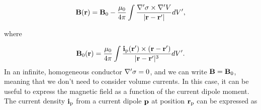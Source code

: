 {\begin{equation}\label{eq:MEG:ampere-laplace-split}
{\bf B}({\bf r}) = {\bf B}_\mathrm{0} - \frac{\mu_0}{4\pi} \int \frac{{\bf \nabla}' \sigma \times {\bf \nabla}' V}{|{\bf r} - {\bf r}'|} dV',
\end{equation}

where 

\begin{equation}\label{eq:MEG:B0}
{\bf B}_0({\bf r}) = \frac{\mu_0}{4\pi} \int \frac{ {\bf i}_\mathrm{p}({\bf r}') \times ({\bf r} - {\bf r}')}{|{\bf r} - {\bf r}'|^3} dV'.
\end{equation}
In an infinite, homogeneous conductor ${\bf \nabla}'\sigma = 0$, and we can write ${\bf B} = {\bf B}_\mathrm{0}$, meaning that we don't need to consider volume currents. In this case, it can be useful to express the magnetic field as a function of the current dipole moment. The current density ${\bf i}_\mathrm{p}$ from a current dipole ${\bf p}$ at position ${\bf r}_\mathrm{p}$ can be 
expressed as}

